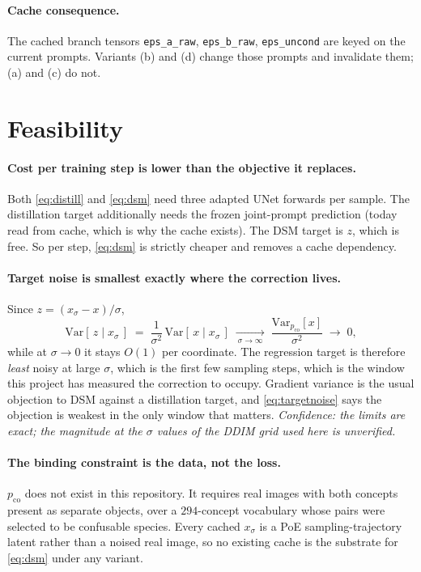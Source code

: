 \documentclass[11pt]{article}
\newcommand{\xs}{x_\sigma}
\theoremstyle{plain}
\theoremstyle{remark}
\begin{document}
\paragraph{Cache consequence.}
The cached branch tensors \texttt{eps\_a\_raw}, \texttt{eps\_b\_raw}, \texttt{eps\_uncond} are
keyed on the current prompts. Variants (b) and (d) change those prompts and invalidate them;
(a) and (c) do not.

\section{Feasibility}

\paragraph{Cost per training step is lower than the objective it replaces.}
Both \eqref{eq:distill} and \eqref{eq:dsm} need three adapted UNet forwards per sample. The
distillation target additionally needs the frozen joint-prompt prediction (today read from
cache, which is why the cache exists). The DSM target is $z$, which is free. So per step,
\eqref{eq:dsm} is strictly cheaper and removes a cache dependency.

\paragraph{Target noise is smallest exactly where the correction lives.}
Since $z = (\xs - x)/\sigma$,
\begin{equation}
  \mathrm{Var}[\,z \mid \xs\,] \;=\; \frac{1}{\sigma^2}\,\mathrm{Var}[\,x \mid \xs\,]
  \;\xrightarrow[\ \sigma \to \infty\ ]{}\; \frac{\mathrm{Var}_{p_{\mathrm{co}}}[x]}{\sigma^2}
  \;\to\; 0 ,
  \label{eq:targetnoise}
\end{equation}
while at $\sigma \to 0$ it stays $O(1)$ per coordinate. The regression target is therefore
\emph{least} noisy at large $\sigma$, which is the first few sampling steps, which is the
window this project has measured the correction to occupy. Gradient variance is the usual
objection to DSM against a distillation target, and \eqref{eq:targetnoise} says the objection
is weakest in the only window that matters. \emph{Confidence: the limits are exact; the
magnitude at the $\sigma$ values of the DDIM grid used here is unverified.}

\paragraph{The binding constraint is the data, not the loss.}
$p_{\mathrm{co}}$ does not exist in this repository. It requires real images with both concepts
present as separate objects, over a $294$-concept vocabulary whose pairs were selected to be
confusable species. Every cached $\xs$ is a PoE sampling-trajectory latent rather than a noised
real image, so no existing cache is the substrate for \eqref{eq:dsm} under any variant.
\end{document}
